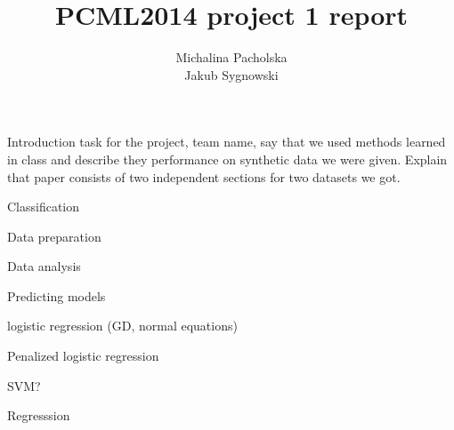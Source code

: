 \documentclass[a4paper,12p]{article}
\author{Michalina Pacholska\\Jakub Sygnowski}
\title{PCML2014 project 1 report}
\begin{document}
\maketitle
\begin{section}{Introduction}
task for the project, team name, say that we used methods learned in class and describe they performance on synthetic data we were given. Explain that paper consists of two independent sections for two datasets we got.
\end{section}

\begin{section}{Classification}
\begin{subsection}{Data preparation}
\end{subsection}
\begin{subsection}{Data analysis}
\end{subsection}
\begin{subsection}{Predicting models}
\begin{subsubsection}{logistic regression (GD, normal equations)}
\end{subsubsection}
\begin{subsubsection}{Penalized logistic regression}
\end{subsubsection}
\begin{subsubsection}{SVM?}
\end{subsubsection}
\end{subsection}
\end{section}

\begin{section}{Regresssion}
\end{section}
\end{document}
